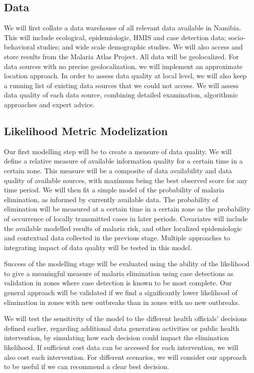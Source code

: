 \subsection{Data}

We will first collate a data warehouse of all relevant data available in Namibia. This will include ecological, epidemiologic, HMIS and case detection data; socio-behavioral studies; and wide scale demographic studies. We will also access and store results from the Malaria Atlas Project. All data will be geolocalized. For data sources with no precise geolocalization, we will implement an approximate location approach. In order to assess data quality at local level, we will also keep a running list of existing data sources that we could not access. We will assess data quality of each data source, combining detailed examination, algorithmic approaches and expert advice.

\subsection{Likelihood Metric Modelization}
Our first modelling step will be to create a measure of data quality. We will define a relative measure of available information quality for a certain time in a certain zone. This measure will be a composite of data availability and data quality of available sources, with maximum being the best observed score for any time period. We will then fit a simple model of the probability of malaria elimination, as informed by currently available data. The probability of elimination will be measured at a certain time in a certain zone as the probability of occurrence of locally transmitted cases in later periods. Covariates will include the available modelled results of malaria risk, and other localized epidemiologic and contextual data collected in the previous stage. Multiple approaches to integrating impact of data quality will be tested in this model.

Success of the modelling stage will be evaluated using the ability of the likelihood to give a meaningful measure of malaria elimination using case detections as validation in zones where case detection is known to be most complete. Our general approach will be validated if we find a significantly lower likelihood of elimination in zones with new outbreaks than in zones with no new outbreaks.

We will test the sensitivity of the model to the different health officials’ decisions defined earlier, regarding additional data generation activities or public health intervention, by simulating how each decision could impact the elimination likelihood. If sufficient cost data can be accessed for each intervention, we will also cost each intervention. For different scenarios, we will consider our approach to be useful if we can recommend a clear best decision.

